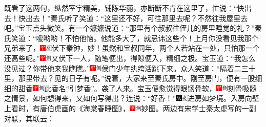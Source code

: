 既看了这两句，纵然室宇精美，铺陈华丽，亦断断不肯在这里了，忙说：``快出去！快出去！''秦氏听了笑道：``这里还不好，可往那里去呢？不然往我屋里去吧。''宝玉点头微笑。有一个嬷嬷说道：``那里有个叔叔往侄儿的房里睡觉的礼？''秦氏笑道：``嗳哟哟！不怕他恼。他能多大了，就忌讳这些个！上月你没看见我那个兄弟来了，{\includegraphics[width=3mm]{../Images/00002}\includegraphics[width=3mm]{../Images/00010}\footnotesize \kaishu 伏下秦钟，妙！}虽然和宝叔同年，两个人若站在一处，只怕那一个还高些呢。''{\includegraphics[width=3mm]{../Images/00002}\includegraphics[width=3mm]{../Images/00011}\footnotesize \kaishu 又伏下一人，随笔便出，得隙便入，精细之极。}宝玉道：``我怎么没见过？你带他来我瞧瞧。''{\includegraphics[width=3mm]{../Images/00002}\includegraphics[width=3mm]{../Images/00011}\footnotesize \kaishu 侯门少年纨绔活跳下来。}众人笑道：``隔着二三十里，那里带去？见的日子有呢。''说着，大家来至秦氏房中。刚至房门，便有一股细细的甜香{\includegraphics[width=3mm]{../Images/00002}\includegraphics[width=3mm]{../Images/00011}\footnotesize \kaishu 此香名``引梦香''。}袭了人来。宝玉便愈觉得眼饧骨软，{\includegraphics[width=3mm]{../Images/00002}\includegraphics[width=3mm]{../Images/00011}\footnotesize \kaishu 刻骨吸髓之情景，如何想得来，又如何写得出？}连说：``好香！''{\includegraphics[width=3mm]{../Images/00009}\includegraphics[width=3mm]{../Images/00012}\footnotesize \kaishu 进房如梦境。}入房向壁上看时，有唐伯虎画的《海棠春睡图》，{\includegraphics[width=3mm]{../Images/00002}\includegraphics[width=3mm]{../Images/00011}\footnotesize \kaishu 妙图。}两边有宋学士秦太虚写的一副对联，其联云：

